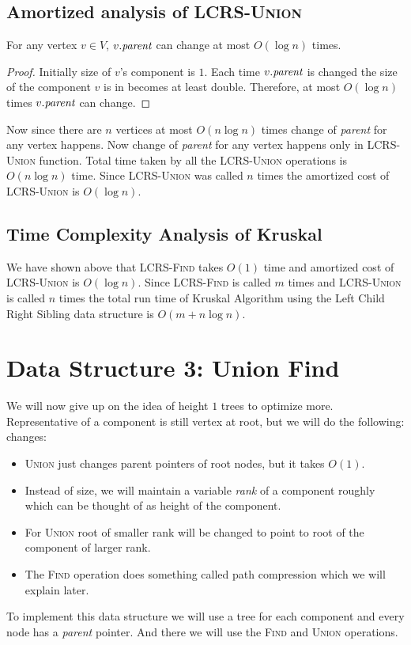 \subsection{Amortized analysis of \textsc{LCRS-Union}}
\begin{lemma}{}{}
	For any vertex $v\in V$, $v.\emph{parent}$ can change at most $O(\log n)$ times.
\end{lemma}
\begin{proof}
	Initially size of $v$'s component is $1$. Each time $v.\emph{parent}$ is changed the size of the component $v$ is in becomes at least double. Therefore, at most $O(\log n)$ times $v.\emph{parent}$ can change.
\end{proof}\parinn

Now since there are $n$ vertices at most $O(n\log n)$ times change of \emph{parent} for any vertex happens. Now change of \emph{parent} for any vertex happens only in \textsc{LCRS-Union} function. Total time taken by all the \textsc{LCRS-Union} operations is $O(n\log n)$ time. Since \textsc{LCRS-Union} was called $n$ times the amortized cost of \textsc{LCRS-Union} is $O(\log n)$.
\subsection{Time Complexity Analysis of Kruskal}
We have shown above that \textsc{LCRS-Find} takes $O(1)$ time and amortized cost of \textsc{LCRS-Union} is $O(\log n)$. Since \textsc{LCRS-Find} is called $m$ times and \textsc{LCRS-Union} is called $n$ times the total run time of Kruskal Algorithm using the Left Child Right Sibling data structure is $O(m+n\log n)$.
\section{Data Structure 3: Union Find}
We will now give up on the idea of height $1$ trees to optimize more. Representative of a component is still vertex at root, but we will do the following: changes:
\begin{itemize}
	\item \textsc{Union} just changes parent pointers of root nodes, but it takes $O(1)$.
	\item Instead of size, we will maintain a variable \emph{rank} of a component roughly which can be thought of as height of the component.
	\item For \textsc{Union} root of smaller rank will be changed to point to root of the component of larger rank.
	\item The \textsc{Find} operation does something called path compression which we will explain later.
\end{itemize}
To implement this data structure we will use a tree for each component and every node has a \emph{parent} pointer. And there we will use the \textsc{Find} and \textsc{Union} operations.

